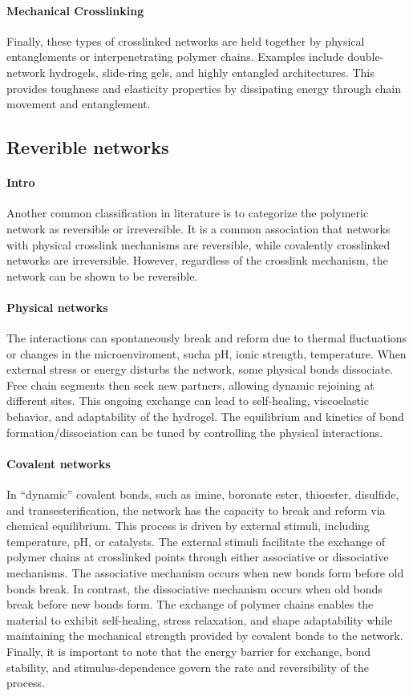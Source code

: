 \paragraph{Mechanical Crosslinking} Finally, these types of crosslinked networks are held together by physical entanglements or interpenetrating polymer chains.
Examples include double-network hydrogels, slide-ring gels, and highly entangled architectures.
This provides toughness and elasticity properties by dissipating energy through chain movement and entanglement.

\subsection{Reverible networks}

\paragraph{Intro} Another common classification in literature is to categorize the polymeric network as reversible or irreversible.
It is a common association that networks with physical crosslink mechanisms are reversible, while covalently crosslinked networks are irreversible.
However, regardless of the crosslink mechanism, the network can be shown to be reversible.

\paragraph{Physical networks} The interactions can spontaneously break and reform due to thermal fluctuations or changes in the microenviroment, sucha pH, ionic strength, temperature.
When external stress or energy disturbs the network, some physical bonds dissociate. 
Free chain segments then seek new partners, allowing dynamic rejoining at different sites. 
This ongoing exchange can lead to self-healing, viscoelastic behavior, and adaptability of the hydrogel.
The equilibrium and kinetics of bond formation/dissociation can be tuned by controlling the physical interactions.

\paragraph{Covalent networks} In ``dynamic'' covalent bonds, such as imine, boronate ester, thioester, disulfide, and transesterification, the network has the capacity to break and reform via chemical equilibrium. 
This process is driven by external stimuli, including temperature, pH, or catalysts.
The external stimuli facilitate the exchange of polymer chains at crosslinked points through either associative or dissociative mechanisms.
The associative mechanism occurs when new bonds form before old bonds break. In contrast, the dissociative mechanism occurs when old bonds break before new bonds form.
The exchange of polymer chains enables the material to exhibit self-healing, stress relaxation, and shape adaptability while maintaining the mechanical strength provided by covalent bonds to the network.
Finally, it is important to note that the energy barrier for exchange, bond stability, and stimulus-dependence govern the rate and reversibility of the process.


